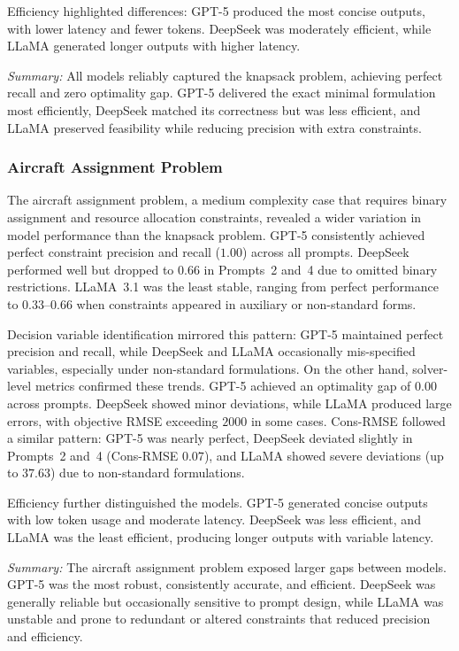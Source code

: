 \documentclass[review,12pt]{elsarticle}
\begin{document}
Efficiency highlighted differences: GPT-5 produced the most concise outputs, with lower latency and fewer tokens. DeepSeek was moderately efficient, while LLaMA generated longer outputs with higher latency.

\textit{Summary:} All models reliably captured the knapsack problem, achieving perfect recall and zero optimality gap. GPT-5 delivered the exact minimal formulation most efficiently, DeepSeek matched its correctness but was less efficient, and LLaMA preserved feasibility while reducing precision with extra constraints.



\subsubsection{Aircraft Assignment Problem}

The aircraft assignment problem, a medium complexity case that requires binary assignment and resource allocation constraints, revealed a wider variation in model performance than the knapsack problem. GPT-5 consistently achieved perfect constraint precision and recall ($1.00$) across all prompts. DeepSeek performed well but dropped to $0.66$ in Prompts~2 and~4 due to omitted binary restrictions. LLaMA~3.1 was the least stable, ranging from perfect performance to $0.33$--$0.66$ when constraints appeared in auxiliary or non-standard forms.

Decision variable identification mirrored this pattern: GPT-5 maintained perfect precision and recall, while DeepSeek and LLaMA occasionally mis-specified variables, especially under non-standard formulations. On the other hand, solver-level metrics confirmed these trends. GPT-5 achieved an optimality gap of $0.00$ across prompts. DeepSeek showed minor deviations, while LLaMA produced large errors, with objective RMSE exceeding $2000$ in some cases. Cons-RMSE followed a similar pattern: GPT-5 was nearly perfect, DeepSeek deviated slightly in Prompts~2 and~4 (Cons-RMSE $0.07$), and LLaMA showed severe deviations (up to $37.63$) due to non-standard formulations.

Efficiency further distinguished the models. GPT-5 generated concise outputs with low token usage and moderate latency. DeepSeek was less efficient, and LLaMA was the least efficient, producing longer outputs with variable latency.

\textit{Summary:} The aircraft assignment problem exposed larger gaps between models. GPT-5 was the most robust, consistently accurate, and efficient. DeepSeek was generally reliable but occasionally sensitive to prompt design, while LLaMA was unstable and prone to redundant or altered constraints that reduced precision and efficiency.
\end{document}
